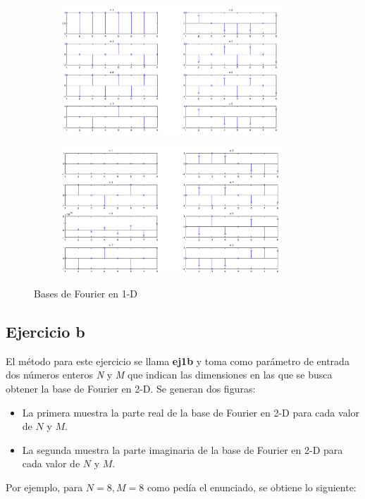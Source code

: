 \documentclass{article}
\begin{document}
\begin{figure}[H]
    \begin{subfigure}{0.5\textwidth}
        \includegraphics[width=0.9\textwidth]{ej1aparteReal8.png}
    \end{subfigure}\hfill
    \begin{subfigure}{0.5\textwidth}
        \includegraphics[width=0.9\textwidth]{ej1aparteImagN8.png}
    \end{subfigure}
    \caption{Bases de Fourier en 1-D}
\end{figure}

\subsection*{Ejercicio b}

El método para este ejercicio se llama \textbf{ej1b} y toma como parámetro de entrada dos números enteros \textit{N} y \textit{M} que indican las dimensiones en las que se busca obtener la base de Fourier en 2-D. Se generan dos figuras:
\begin{itemize}
\item La primera muestra la parte real de la base de Fourier en 2-D para cada valor de $N$ y $M$.
\item La segunda muestra la parte imaginaria de la base de Fourier en 2-D para cada valor de $N$ y $M$.
\end{itemize} Por ejemplo, para $N=8, M=8$ como pedía el enunciado, se obtiene lo siguiente:
\end{document}
